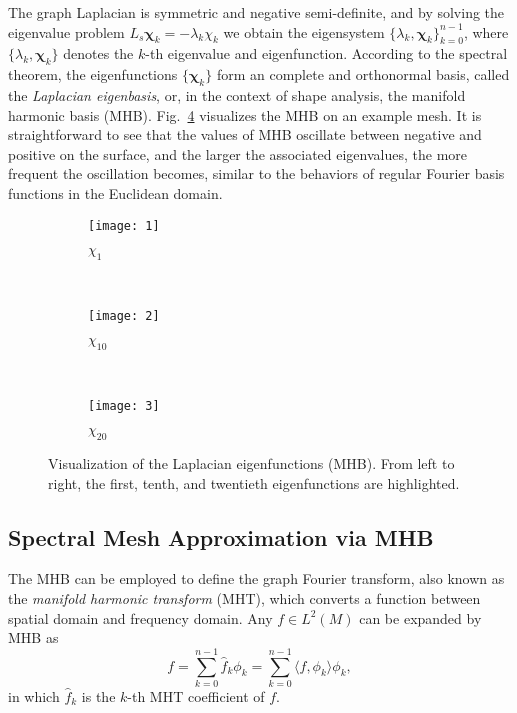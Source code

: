 The graph Laplacian is symmetric and negative semi-definite, and by
solving the eigenvalue problem $L_s\mathbf{\chi}_k=-\lambda_k\chi_k$
we obtain the eigensystem $\{\lambda_k,\mathbf{\chi}_k\}_{k=0}^{n-1}$,
where $\{\lambda_k,\mathbf{\chi}_k\}$ denotes the $k$-th eigenvalue
and eigenfunction. According to the spectral theorem, the
eigenfunctions $\{\mathbf{\chi}_k\}$ form an complete and orthonormal
basis, called the \emph{Laplacian eigenbasis}, or, in the context of
shape analysis, the manifold harmonic basis
(MHB).  Fig.~\ref{fig:mhb} visualizes the MHB
on an example mesh. It is straightforward to see that the values of
MHB oscillate between negative and positive on the surface, and the
larger the associated eigenvalues, the more frequent the oscillation
becomes, similar to the behaviors of regular Fourier basis functions
in the Euclidean domain.
\begin{figure}
        \centering
        \begin{subfigure}[b]{0.3\linewidth}
                \texttt{[image: 1]}
                \caption{$\chi_1$}
                \label{fig:wolf_mhb_1}
        \end{subfigure}%
        ~
        \begin{subfigure}[b]{0.3\linewidth}
                \texttt{[image: 2]}
                \caption{$\chi_{10}$}
                \label{fig:wolf_mhb_10}
        \end{subfigure}
        ~
        \begin{subfigure}[b]{0.3\linewidth}
                \texttt{[image: 3]}
                \caption{$\chi_{20}$}
                \label{fig:wolf_mhb_20}
        \end{subfigure}
        \caption[Visualization of MHBs.]
        {Visualization of the Laplacian eigenfunctions (MHB).
         From left to right, the first, tenth, and twentieth
         eigenfunctions are highlighted.}
        \label{fig:mhb}
\end{figure}

\subsection{Spectral Mesh Approximation via MHB}
\label{sec:mhbapprox}

The MHB can be employed to define the graph Fourier transform, also
known as the \emph{manifold harmonic transform} (MHT), which converts
a function between spatial domain and frequency domain. Any $f\in
L^2(M)$ can be expanded by MHB as
\begin{equation}
\label{eq:mht}
f = \sum_{k=0}^{n-1}\widehat{f}_k\phi_k = \sum_{k=0}^{n-1}\langle f,\phi_k\rangle\phi_k,
\end{equation}
in which $\widehat{f}_k$ is the $k$-th MHT coefficient of $f$.


